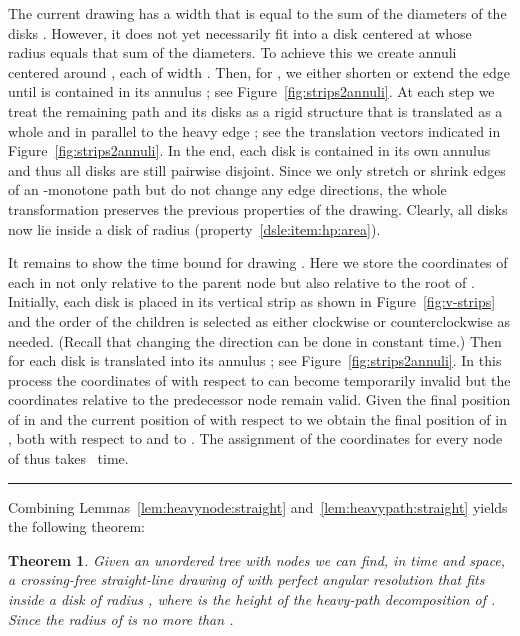 \documentclass[11pt]{article}
\newtheorem{theorem}{Theorem}
\newcommand{\qed}{\hspace*{\fill}\rule{6pt}{6pt}}
\newenvironment{proof}{\noindent{\bf Proof:}}{\bigskip} \makeatletter
\begin{document}
\begin{proof}
  The current drawing has a width that is equal to the sum of the
  diameters of the disks . However, it does not yet
  necessarily fit into a disk  centered at  whose radius
  equals that sum of the diameters. To achieve this we create 
  annuli  centered around , each  of width
  . Then, for , we either shorten or extend the
  edge  until  is contained in its annulus ; see
  Figure~\ref{fig:strips2annuli}. At each step  we treat the
  remaining path  and its disks 
  as a rigid structure that is translated as a whole and in parallel to the heavy edge ; see the 
  translation vectors indicated in Figure~\ref{fig:strips2annuli}. In
  the end, each disk  is contained in its own annulus  and
  thus all disks are still pairwise disjoint. Since we only stretch or
  shrink edges of an -monotone path but do not change any edge
  directions, the whole transformation preserves the previous
  properties of the drawing. Clearly, all disks now lie inside a disk
   of radius 
  (property~\ref{dsle:item:hp:area}).

	It remains to show the  time bound for drawing .
	Here we store the coordinates of each  in  not only relative to the parent node  but also relative to the root  of .
	Initially, each disk is placed in its vertical strip as shown in Figure~\ref{fig:v-strips} and the order of the children is selected as either clockwise or counterclockwise as needed. (Recall that changing the direction can be done in constant time.)
	Then for  each disk  is translated into its annulus ; see Figure~\ref{fig:strips2annuli}.
	In this process the coordinates of  with respect to  can become temporarily invalid but the coordinates relative to the predecessor node  remain valid.
	Given the final position of  in  and the current position of  with respect to  we obtain the final position of  in , both with respect to  and to . 
	The assignment of the coordinates for every node of  thus takes~ time.
\qed
\end{proof}

Combining Lemmas~\ref{lem:heavynode:straight}
and~\ref{lem:heavypath:straight} yields the following theorem:

\begin{theorem}\label{thm:straight}
  Given an unordered tree  with  nodes we can find, in  time and space, a
  crossing-free straight-line drawing of  with perfect angular
  resolution that fits inside a disk  of radius , where  is the height of the heavy-path decomposition of
  . Since  the radius of  is no more than . 
\end{theorem}
\end{document}
